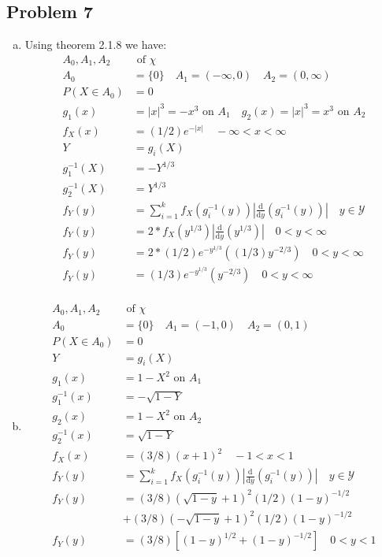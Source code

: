 \documentclass{article}
\newcommand{\yderiv}[1]{\frac{\mathrm{d}}{\mathrm{d}y} (#1)}
\begin{document}
\begin{flushleft}
\section*{Problem 7}
\begin{enumerate}[(a)]
\item 
Using theorem 2.1.8 we have:
\begin{align*}
A_0,A_1,A_2 &\text{ of } \chi\\
A_0&=\{0\} \quad A_1=(-\infty,0) \quad A_2=(0,\infty)\\
P(X \in A_0)&=0\\
g_1(x)&=|x|^3=-x^3 \text{ on } A_1 \quad g_2(x)=|x|^3=x^3 \text{ on } A_2\\
f_X(x)&=(1/2)e^{-|x|} \quad -\infty<x<\infty\\
Y&=g_i(X)\\
g_1^{-1}(X)&=-Y^{1/3}\\
g_2^{-1}(X)&=Y^{1/3}\\
f_Y(y)&=\sum_{i=1}^{k}f_X(g_i^{-1}(y))\left|\yderiv{g_i^{-1}(y)}\right| \quad y \in \mathcal{Y}\\
f_Y(y)&=2*f_X(y^{1/3})\left|\yderiv{y^{1/3}}\right| \quad 0<y<\infty\\
f_Y(y)&=2*(1/2)e^{-y^{1/3}}((1/3)y^{-2/3}) \quad 0<y<\infty\\
f_Y(y)&=(1/3)e^{-y^{1/3}}(y^{-2/3}) \quad 0<y<\infty\\
\end{align*}
\item
\begin{align*}
A_0,A_1,A_2 &\text{ of } \chi\\
A_0&=\{0\} \quad A_1=(-1,0) \quad A_2 = (0,1)\\
P(X \in A_0)&=0\\
Y&=g_i(X)\\
g_1(x)&=1-X^2 \text{ on } A_1\\
g_1^{-1}(x)&=-\sqrt{1-Y}\\
g_2(x)&=1-X^2 \text{ on } A_2\\
g_2^{-1}(x)&=\sqrt{1-Y}\\
f_X(x)&=(3/8)(x+1)^2 \quad -1<x<1\\
f_Y(y)&=\sum_{i=1}^{k}f_X(g_i^{-1}(y))\left|\yderiv{g_i^{-1}(y)}\right| \quad y \in \mathcal{Y}\\
f_Y(y)&=(3/8)(\sqrt{1-y}+1)^2(1/2)(1-y)^{-1/2}\\
&+(3/8)(-\sqrt{1-y}+1)^2(1/2)(1-y)^{-1/2}\\
f_Y(y)&=(3/8)[(1-y)^{1/2}+(1-y)^{-1/2}] \quad 0<y<1
\end{align*}

\end{enumerate}
\end{flushleft}
\end{document}
